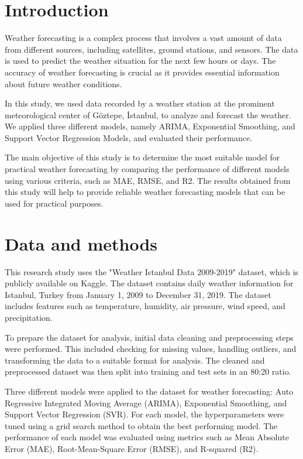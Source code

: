 \documentclass[conference,letterpaper]{IEEEtran}
\begin{document}
\section{Introduction}

Weather forecasting is a complex process that involves a vast amount of data from different sources, including satellites, ground stations, and sensors. The data is used to predict the weather situation for the next few hours or days. The accuracy of weather forecasting is crucial as it provides essential information about future weather conditions.

In this study, we used data recorded by a weather station at the prominent meteorological center of Göztepe, İstanbul, to analyze and forecast the weather. We applied three different models, namely ARIMA, Exponential Smoothing, and Support Vector Regression Models, and evaluated their performance.

The main objective of this study is to determine the most suitable model for practical weather forecasting by comparing the performance of different models using various criteria, such as MAE, RMSE, and R2. The results obtained from this study will help to provide reliable weather forecasting models that can be used for practical purposes.

\section{Data and methods}
This research study uses the "Weather Istanbul Data 2009-2019" dataset, which is publicly available on Kaggle. The dataset contains daily weather information for Istanbul, Turkey from January 1, 2009 to December 31, 2019. The dataset includes features such as temperature, humidity, air pressure, wind speed, and precipitation.

To prepare the dataset for analysis, initial data cleaning and preprocessing steps were performed. This included checking for missing values, handling outliers, and transforming the data to a suitable format for analysis. The cleaned and preprocessed dataset was then split into training and test sets in an 80:20 ratio.

Three different models were applied to the dataset for weather forecasting: Auto Regressive Integrated Moving Average (ARIMA), Exponential Smoothing, and Support Vector Regression (SVR). For each model, the hyperparameters were tuned using a grid search method to obtain the best performing model. The performance of each model was evaluated using metrics such as Mean Absolute Error (MAE), Root-Mean-Square Error (RMSE), and R-squared (R2).
\end{document}
